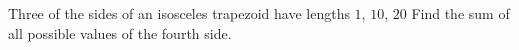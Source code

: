 Three of the sides of an isosceles trapezoid have lengths $1$, $10$, $20$ Find the sum of all possible values of the fourth side.
